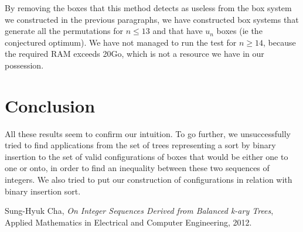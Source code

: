 \documentclass[11pt, a4paper]{article}
\begin{document}
By removing the boxes that this method detects as useless from the box system we
constructed in the previous paragraphs, we have constructed box systems that
generate all the permutations for $n \leq 13$ and that have $u_n$ boxes (ie the
conjectured optimum). We have not managed to run the test for $n \geq 14$,
because the required RAM exceeds 20Go, which is not a resource we have in our
possession.

\section{Conclusion}

All these results seem to confirm our intuition.
To go further, we unsuccessfully tried to find applications from the set of trees representing a sort by binary insertion to the set of valid configurations of boxes 
that would be either one to one or onto, in order to find an inequality between these two sequences of integers.
We also tried to put our construction of configurations in relation with binary insertion sort. 

\begin{thebibliography}{1}

Sung-Hyuk Cha, {\em On Integer Sequences Derived from Balanced k-ary Trees}, Applied Mathematics in Electrical and Computer Engineering, 2012.

\end{thebibliography}
\end{document}

